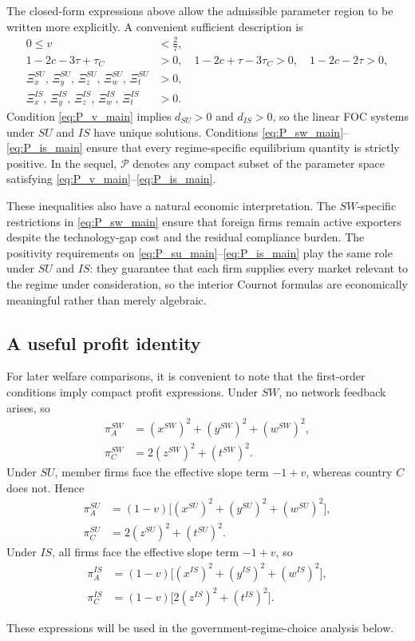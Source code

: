 The closed-form expressions above allow the admissible parameter region to be
written more explicitly. A convenient sufficient description is
\begin{align}
0\le v &< \frac{2}{7}, \label{eq:P_v_main}\\
1-2c-3\tau+\tau_C &> 0,\quad
1-2c+\tau-3\tau_C > 0,\quad
1-2c-2\tau > 0, \label{eq:P_sw_main}\\
\Xi_x^{SU},\,\Xi_y^{SU},\,\Xi_z^{SU},\,\Xi_w^{SU},\,\Xi_t^{SU} &> 0,
\label{eq:P_su_main}\\
\Xi_x^{IS},\,\Xi_y^{IS},\,\Xi_z^{IS},\,\Xi_w^{IS},\,\Xi_t^{IS} &> 0.
\label{eq:P_is_main}
\end{align}
Condition \eqref{eq:P_v_main} implies $d_{SU}>0$ and $d_{IS}>0$, so the linear
FOC systems under $SU$ and $IS$ have unique solutions. Conditions
\eqref{eq:P_sw_main}--\eqref{eq:P_is_main} ensure that every regime-specific
equilibrium quantity is strictly positive. In the sequel, $\mathcal P$ denotes
any compact subset of the parameter space satisfying
\eqref{eq:P_v_main}--\eqref{eq:P_is_main}.

These inequalities also have a natural economic interpretation. The
$SW$-specific restrictions in \eqref{eq:P_sw_main} ensure that foreign firms
remain active exporters despite the technology-gap cost and the residual
compliance burden. The positivity requirements on
\eqref{eq:P_su_main}--\eqref{eq:P_is_main} play the same role under $SU$ and
$IS$: they guarantee that each firm supplies every market relevant to the
regime under consideration, so the interior Cournot formulas are economically
meaningful rather than merely algebraic.

\subsection{A useful profit identity}

For later welfare comparisons, it is convenient to note that the first-order conditions imply compact profit expressions. Under $SW$, no network feedback arises, so
\begin{align}
\pi_A^{SW} &= (x^{SW})^2+(y^{SW})^2+(w^{SW})^2, \label{eq:piA_sw_main}\\
\pi_C^{SW} &= 2(z^{SW})^2+(t^{SW})^2. \label{eq:piC_sw_main}
\end{align}
Under $SU$, member firms face the effective slope term $-1+v$, whereas country $C$ does not. Hence
\begin{align}
\pi_A^{SU} &= (1-v)\Big[(x^{SU})^2+(y^{SU})^2+(w^{SU})^2\Big], \label{eq:piA_su_main}\\
\pi_C^{SU} &= 2(z^{SU})^2+(t^{SU})^2. \label{eq:piC_su_main}
\end{align}
Under $IS$, all firms face the effective slope term $-1+v$, so
\begin{align}
\pi_A^{IS} &= (1-v)\Big[(x^{IS})^2+(y^{IS})^2+(w^{IS})^2\Big], \label{eq:piA_is_main}\\
\pi_C^{IS} &= (1-v)\Big[2(z^{IS})^2+(t^{IS})^2\Big]. \label{eq:piC_is_main}
\end{align}

These expressions will be used in the government-regime-choice analysis below.
